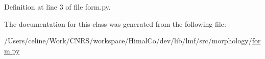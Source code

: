 Definition at line 3 of file form.\+py.



The documentation for this class was generated from the following file\+:\begin{DoxyCompactItemize}
\item 
/\+Users/celine/\+Work/\+C\+N\+R\+S/workspace/\+Himal\+Co/dev/lib/lmf/src/morphology/\hyperlink{morphology_2form_8py}{form.\+py}\end{DoxyCompactItemize}
